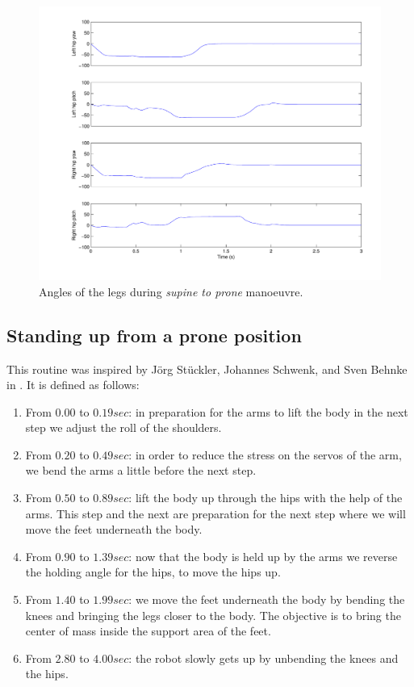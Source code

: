 \begin{figure}[htp]
\center
    \includegraphics[width = \textwidth]{figures/sup2proneLegs}
    \caption[Angles of the legs during \emph{supine to prone} manoeuvre]{Angles of the legs during \emph{supine to prone} manoeuvre.}
    \label{fig:sup2proneLegs}
\end{figure}

\subsection{Standing up from a prone position}
This routine was inspired by Jörg Stückler, Johannes Schwenk, and Sven Behnke in \cite{Stuckler06}. It is defined as follows:\begin{enumerate}
\item From $0.00$ to $0.19sec$: in preparation for the arms to lift the body in the next step we adjust the roll of the shoulders.

\item From $0.20$ to $0.49sec$: in order to reduce the stress on the servos of the arm, we bend the arms a little before the next step.

\item From $0.50$ to $0.89sec$: lift the body up through the hips with the help of the arms. This step and the next are preparation for the next step where we will move the feet underneath the body.

\item From $0.90$ to $1.39sec$: now that the body is held up by the arms we reverse the holding angle for the hips, to move the hips up. 

\item From $1.40$ to $1.99sec$:  we move the feet underneath the body by bending the knees and bringing the legs closer to the body. The objective is to bring the center of mass inside the support area of the feet.

\item From $2.80$ to $4.00sec$: the robot slowly gets up by unbending the knees and the hips. 
\end{enumerate}

